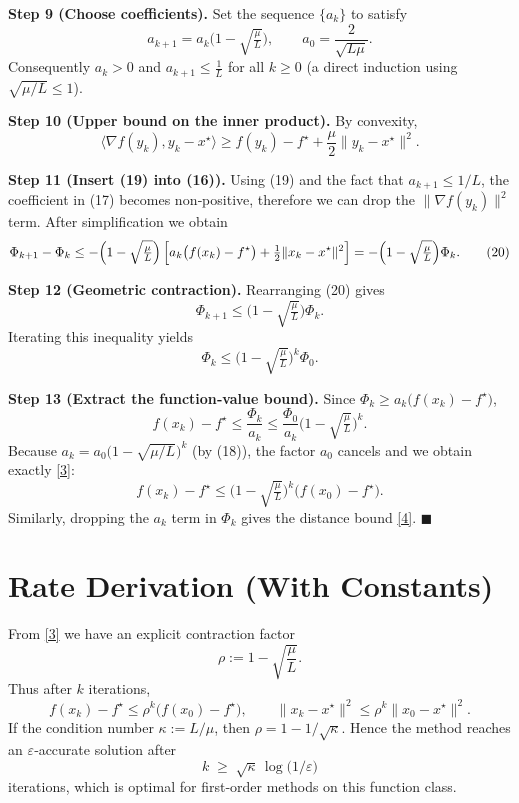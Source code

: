 \documentclass{article}
\begin{document}
\noindent\textbf{Step 9 (Choose coefficients).} Set the sequence $\{a_{k}\}$ to satisfy
\[
a_{k+1}=a_{k}\bigl(1-\sqrt{\tfrac{\mu}{L}}\bigr),\qquad 
a_{0}= \frac{2}{\sqrt{L\mu}} . \tag{18}
\]
Consequently $a_{k}>0$ and $a_{k+1}\le \frac{1}{L}$ for all $k\ge0$ (a direct induction using $\sqrt{\mu/L}\le1$).

\noindent\textbf{Step 10 (Upper bound on the inner product).} By convexity,
\[
\langle\nabla f(y_{k}),y_{k}-x^{\star}\rangle
\ge f(y_{k})-f^{\star}+\frac{\mu}{2}\|y_{k}-x^{\star}\|^{2}. \tag{19}
\]

\noindent\textbf{Step 11 (Insert (19) into (16)).} Using (19) and the fact that $a_{k+1}\le 1/L$, the coefficient in (17) becomes non‑positive, therefore we can drop the $\|\nabla f(y_{k})\|^{2}$ term. After simplification we obtain
\[
\Phi_{k+1}-\Phi_{k}
\le -\Bigl(1-\sqrt{\tfrac{\mu}{L}}\Bigr)\,
\Bigl[ a_{k}\bigl(f(x_{k})-f^{\star}\bigr)+\tfrac12\|x_{k}-x^{\star}\|^{2}\Bigr]
= -\Bigl(1-\sqrt{\tfrac{\mu}{L}}\Bigr)\Phi_{k}. \tag{20}
\]

\noindent\textbf{Step 12 (Geometric contraction).} Rearranging (20) gives
\[
\Phi_{k+1}\le \bigl(1-\sqrt{\tfrac{\mu}{L}}\bigr)\Phi_{k}.
\]
Iterating this inequality yields
\[
\Phi_{k}\le \bigl(1-\sqrt{\tfrac{\mu}{L}}\bigr)^{k}\Phi_{0}. \tag{21}
\]

\noindent\textbf{Step 13 (Extract the function‑value bound).} Since $\Phi_{k}\ge a_{k}\bigl(f(x_{k})-f^{\star}\bigr)$,
\[
f(x_{k})-f^{\star}\le \frac{\Phi_{k}}{a_{k}}
\le \frac{\Phi_{0}}{a_{k}}\bigl(1-\sqrt{\tfrac{\mu}{L}}\bigr)^{k}.
\]
Because $a_{k}=a_{0}\bigl(1-\sqrt{\mu/L}\bigr)^{k}$ (by (18)), the factor $a_{0}$ cancels and we obtain exactly \eqref{3}:
\[
f(x_{k})-f^{\star}\le \bigl(1-\sqrt{\tfrac{\mu}{L}}\bigr)^{k}\bigl(f(x_{0})-f^{\star}\bigr).
\]
Similarly, dropping the $a_{k}$ term in $\Phi_{k}$ gives the distance bound \eqref{4}. \hfill $\blacksquare$

\section*{Rate Derivation (With Constants)}
From \eqref{3} we have an explicit contraction factor
\[
\rho:=1-\sqrt{\frac{\mu}{L}}.
\]
Thus after $k$ iterations,
\[
f(x_{k})-f^{\star}\le\rho^{k}\bigl(f(x_{0})-f^{\star}\bigr),
\qquad
\|x_{k}-x^{\star}\|^{2}\le\rho^{k}\|x_{0}-x^{\star}\|^{2}.
\]
If the condition number $\kappa:=L/\mu$, then $\rho=1-1/\sqrt{\kappa}$. Hence the method reaches an $\varepsilon$‑accurate solution after
\[
k\;\ge\; \sqrt{\kappa}\,\log\!\bigl(1/\varepsilon\bigr)
\]
iterations, which is optimal for first‑order methods on this function class.
\end{document}
